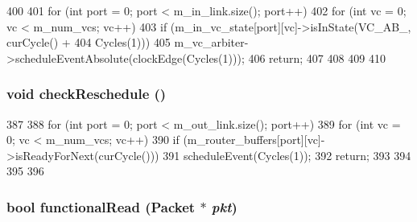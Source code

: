 \begin{DoxyCode}
400 {
401     for (int port = 0; port < m_in_link.size(); port++) {
402         for (int vc = 0; vc < m_num_vcs; vc++) {
403             if (m_in_vc_state[port][vc]->isInState(VC_AB_, curCycle() +
404                                                    Cycles(1))) {
405                 m_vc_arbiter->scheduleEventAbsolute(clockEdge(Cycles(1)));
406                 return;
407             }
408         }
409     }
410 }
\end{DoxyCode}
\hypertarget{classRouter_af954e8e2150e2ce2e1b87081bbd9c678}{
\subsubsection[{checkReschedule}]{\setlength{\rightskip}{0pt plus 5cm}void checkReschedule ()}}
\label{classRouter_af954e8e2150e2ce2e1b87081bbd9c678}



\begin{DoxyCode}
387 {
388     for (int port = 0; port < m_out_link.size(); port++) {
389         for (int vc = 0; vc < m_num_vcs; vc++) {
390             if (m_router_buffers[port][vc]->isReadyForNext(curCycle())) {
391                 scheduleEvent(Cycles(1));
392                 return;
393             }
394         }
395     }
396 }
\end{DoxyCode}
\hypertarget{classRouter_a6db56c593ee28a561c47e75a859300dd}{
\subsubsection[{functionalRead}]{\setlength{\rightskip}{0pt plus 5cm}bool functionalRead ({\bf Packet} $\ast$ {\em pkt})}}
\label{classRouter_a6db56c593ee28a561c47e75a859300dd}



